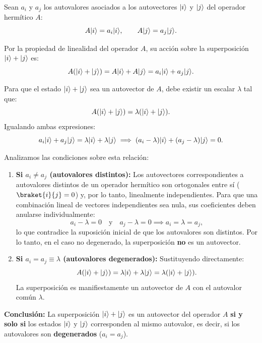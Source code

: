 \begin{resolucion}
Sean $a_i$ y $a_j$ los autovalores asociados a los autovectores $\lvert i\rangle$ y $\lvert j\rangle$ del operador hermítico $A$:
\[
A\lvert i\rangle = a_i\lvert i\rangle, \qquad A\lvert j\rangle = a_j\lvert j\rangle.
\]

Por la propiedad de linealidad del operador $A$, su acción sobre la superposición $\lvert i\rangle + \lvert j\rangle$ es:
\[
A(\lvert i\rangle + \lvert j\rangle) = A\lvert i\rangle + A\lvert j\rangle = a_i\lvert i\rangle + a_j\lvert j\rangle.
\]

Para que el estado $\lvert i\rangle + \lvert j\rangle$ sea un autovector de $A$, debe existir un escalar $\lambda$ tal que:
\[
A(\lvert i\rangle + \lvert j\rangle) = \lambda(\lvert i\rangle + \lvert j\rangle).
\]
Igualando ambas expresiones:
\[
a_i\lvert i\rangle + a_j\lvert j\rangle = \lambda\lvert i\rangle + \lambda\lvert j\rangle \implies (a_i - \lambda)\lvert i\rangle + (a_j - \lambda)\lvert j\rangle = 0.
\]

Analizamos las condiciones sobre esta relación:

\begin{enumerate}
  \item \textbf{Si $a_i \neq a_j$ (autovalores distintos):} Los autovectores correspondientes a autovalores distintos de un operador hermítico son ortogonales entre sí ($\braket{i}{j} = 0$) y, por lo tanto, linealmente independientes. Para que una combinación lineal de vectores independientes sea nula, sus coeficientes deben anularse individualmente:
  \[
  a_i - \lambda = 0 \quad \text{y} \quad a_j - \lambda = 0 \implies a_i = \lambda = a_j,
  \]
  lo que contradice la suposición inicial de que los autovalores son distintos. Por lo tanto, en el caso no degenerado, la superposición \textbf{no} es un autovector.

  \item \textbf{Si $a_i = a_j \equiv \lambda$ (autovalores degenerados):} Sustituyendo directamente:
  \[
  A(\lvert i\rangle + \lvert j\rangle) = \lambda\lvert i\rangle + \lambda\lvert j\rangle = \lambda(\lvert i\rangle + \lvert j\rangle).
  \]
  La superposición es manifiestamente un autovector de $A$ con el autovalor común $\lambda$.
\end{enumerate}

\textbf{Conclusión:} La superposición $\lvert i\rangle + \lvert j\rangle$ es un autovector del operador $A$ \textbf{si y solo si} los estados $\lvert i\rangle$ y $\lvert j\rangle$ corresponden al mismo autovalor, es decir, si los autovalores son \textbf{degenerados} ($a_i = a_j$).
\end{resolucion}
